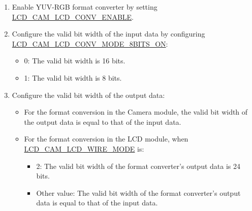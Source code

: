 \documentclass[main\_\_EN.tex]{subfiles}
\begin{document}
\begin{enumerate}
    \item Enable YUV-RGB format converter by setting  \hyperref[fielddesc:LCDCAMLCDCONVENABLE]{LCD\_CAM\_LCD\_CONV\_ENABLE}.
    \item Configure the valid bit width of the input data by configuring \hyperref[fielddesc:LCDCAMLCDCONVMODE8BITSON]{LCD\_CAM\_LCD\_CONV\_MODE\_8BITS\_ON}:
    \begin{itemize}
        \item 0: The valid bit width is 16 bits.
        \item 1: The valid bit width is 8 bits.
    \end{itemize}
    \item Configure the valid bit width of the output data:
        \begin{itemize}
            \item For the format conversion in the Camera module, the valid bit width of the output data is equal to that of the input data.
            \item For the format conversion in the LCD module, when \hyperref[fielddesc:LCDCAMLCDWIREMODE]{LCD\_CAM\_LCD\_WIRE\_MODE} is:
            \begin{itemize}
                \item 2: The valid bit width of the format converter's output data is 24 bits.
                \item Other value: The valid bit width of the format converter's output data is equal to that of the input data.
            \end{itemize}
        \end{itemize}


\end{enumerate}
\end{document}
